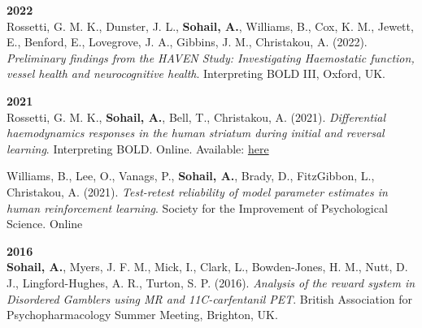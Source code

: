 \textbf{2022}\\
Rossetti, G. M. K., Dunster, J. L., \textbf{Sohail, A.}, Williams, B., Cox, K. M., Jewett, E., Benford, E., Lovegrove, J. A., Gibbins, J. M., Christakou, A. (2022). \emph{Preliminary findings from the HAVEN Study: Investigating Haemostatic function, vessel health and neurocognitive health}. Interpreting BOLD III, Oxford, UK.
\vspace{1em}

\textbf{2021}\\
Rossetti, G. M. K., \textbf{Sohail, A.}, Bell, T., Christakou, A. (2021). \emph{Differential haemodynamics responses in the human striatum during initial and reversal learning}. Interpreting BOLD. Online. Available: \href{https://github.com/sohaamir/misc_materials/tree/main/posters}{here}
\vspace{0.5em}

Williams, B., Lee, O., Vanags, P., \textbf{Sohail, A.}, Brady, D., FitzGibbon, L., Christakou, A. (2021). \emph{Test-retest reliability of model parameter estimates in human reinforcement learning}. Society for the Improvement of Psychological Science. Online
\vspace{1em}

\textbf{2016}\\
\textbf{Sohail, A.}, Myers, J. F. M., Mick, I., Clark, L., Bowden-Jones, H. M., Nutt, D. J., Lingford-Hughes, A. R., Turton, S. P. (2016). \emph{Analysis of the reward system in Disordered Gamblers using MR and 11C-carfentanil PET}. British Association for Psychopharmacology Summer Meeting, Brighton, UK.